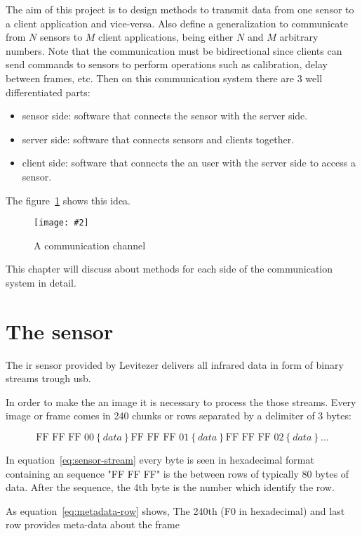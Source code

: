 \documentclass[hidelinks,11pt,a4paper,oneside,article]{memoir}
\newcommand{\putimage}[3][10] %
{
\begin{figure}[h]
	\centering
	\captionsetup{justification=centering}
	\texttt{[image: \#2]}
	\caption{#3}
	\label{fig:#2}
\end{figure}
}
\begin{document}
The aim of this project is to design methods to transmit data from one sensor to a client application and vice-versa. Also define a generalization to communicate from $N$ sensors to $M$ client applications, being either $N$ and $M$ arbitrary numbers. Note that the communication must be bidirectional since clients can send commands to sensors to perform operations such as calibration, delay between frames, etc. Then on this communication system there are 3 well differentiated parts:
\begin{itemize}
    \item sensor side: software that connects the sensor with the server side.
    \item server side: software that connects sensors and clients together.
    \item client side: software that connects the an user with the server side to access a sensor.
\end{itemize}

The figure~\ref{fig:communication-channel} shows this idea.

\putimage{communication-channel}{A communication channel}

This chapter will discuss about methods for each side of the communication system in detail.


\section{The sensor}
The \gls{ir} sensor provided by Levitezer delivers all infrared data in form of binary streams trough \gls{usb}.

 In order to make the an image it is necessary to process the those streams. Every image or frame comes in 240 chunks or rows separated by a delimiter of 3 bytes:

\begin{equation}
\label{eq:sensor-stream}
\text {FF FF FF 00} \left\lbrace data \right\rbrace 
\text {FF FF FF 01} \left\lbrace data \right\rbrace 
\text {FF FF FF 02} \left\lbrace data \right\rbrace \dots
\end{equation}



In equation~\ref{eq:sensor-stream} every byte is seen in hexadecimal format containing an sequence "FF FF FF" is the between rows of typically 80 bytes of data. After the sequence, the 4th byte is the number which identify the row.

As equation~\ref{eq:metadata-row} shows, The 240th (F0 in hexadecimal) and last row provides meta-data about the frame
\end{document}
